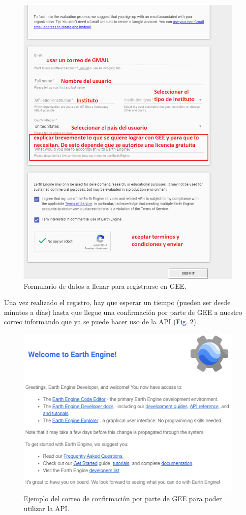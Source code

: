 \documentclass[
  12pt,
  letterpaper,
  twoside]{book}
\begin{document}
\begin{figure}[H]

{\centering \includegraphics[width=0.6\linewidth]{Img/formulario} 

}

\caption{Formulario de datos a llenar para registrarse en GEE.}\label{fig:f22}
\end{figure}

Una vez realizado el registro, hay que esperar un tiempo (pueden ser desde minutos a días) hasta que llegue una confirmación por parte de GEE a nuestro correo informando que ya se puede hacer uso de la API (\textcolor{darkblue}{Fig.} \ref{fig:f23}).

\begin{figure}[H]

{\centering \includegraphics[width=0.6\linewidth]{Img/correo} 

}

\caption{Ejemplo del correo de confirmación por parte de GEE para poder utilizar la API.}\label{fig:f23}
\end{figure}
\end{document}

